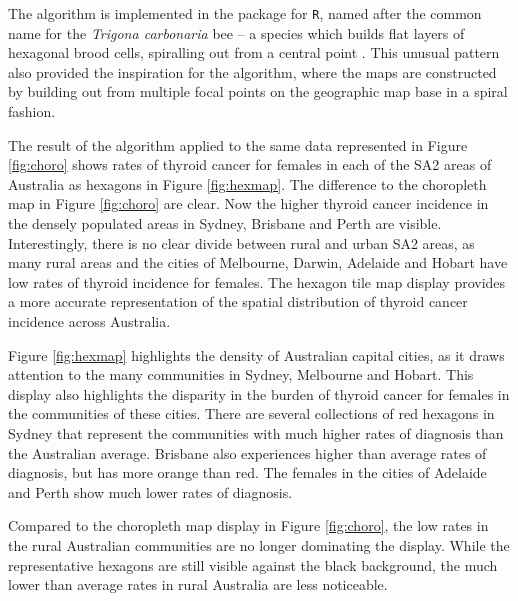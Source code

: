 The algorithm is implemented in the  package for
\texttt{R}, named after the common name for the \emph{Trigona
carbonaria} bee -- a species which builds flat layers of hexagonal brood
cells, spiralling out from a central point \citep{PH}. This unusual
pattern also provided the inspiration for the algorithm, where the maps
are constructed by building out from multiple focal points on the
geographic map base in a spiral fashion.

The result of the algorithm applied to the same data represented in
Figure \ref{fig:choro} shows rates of thyroid cancer for females in each
of the SA2 areas of Australia as hexagons in Figure \ref{fig:hexmap}.
The difference to the choropleth map in Figure \ref{fig:choro} are
clear. Now the higher thyroid cancer incidence in the densely populated
areas in Sydney, Brisbane and Perth are visible. Interestingly, there is
no clear divide between rural and urban SA2 areas, as many rural areas
and the cities of Melbourne, Darwin, Adelaide and Hobart have low rates
of thyroid incidence for females. The hexagon tile map display provides
a more accurate representation of the spatial distribution of thyroid
cancer incidence across Australia.

Figure \ref{fig:hexmap} highlights the density of Australian capital
cities, as it draws attention to the many communities in Sydney,
Melbourne and Hobart. This display also highlights the disparity in the
burden of thyroid cancer for females in the communities of these cities.
There are several collections of red hexagons in Sydney that represent
the communities with much higher rates of diagnosis than the Australian
average. Brisbane also experiences higher than average rates of
diagnosis, but has more orange than red. The females in the cities of
Adelaide and Perth show much lower rates of diagnosis.

Compared to the choropleth map display in Figure \ref{fig:choro}, the
low rates in the rural Australian communities are no longer dominating
the display. While the representative hexagons are still visible against
the black background, the much lower than average rates in rural
Australia are less noticeable.

